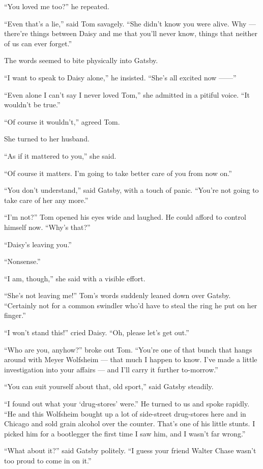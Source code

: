 \documentclass{znotebook}
\begin{document}
``You loved me too?'' he repeated.

``Even that's a lie,'' said Tom savagely. ``She didn't know you were alive. Why — there're things between Daisy and me that you'll never know, things that neither of us can ever forget.''

The words seemed to bite physically into Gatsby.

``I want to speak to Daisy alone,'' he insisted. ``She's all excited now ——''

``Even alone I can't say I never loved Tom,'' she admitted in a pitiful voice. ``It wouldn't be true.''

``Of course it wouldn't,'' agreed Tom.

She turned to her husband.

``As if it mattered to you,'' she said.

``Of course it matters. I'm going to take better care of you from now on.''

``You don't understand,'' said Gatsby, with a touch of panic. ``You're not going to take care of her any more.''

``I'm not?'' Tom opened his eyes wide and laughed. He could afford to control himself now. ``Why's that?''

``Daisy's leaving you.''

``Nonsense.''

``I am, though,'' she said with a visible effort.

``She's not leaving me!'' Tom's words suddenly leaned down over Gatsby. ``Certainly not for a common swindler who'd have to steal the ring he put on her finger.''

``I won't stand this!'' cried Daisy. ``Oh, please let's get out.''

``Who are you, anyhow?'' broke out Tom. ``You're one of that bunch that hangs around with Meyer Wolfsheim — that much I happen to know. I've made a little investigation into your affairs — and I'll carry it further to-morrow.''

``You can suit yourself about that, old sport,'' said Gatsby steadily.

``I found out what your ‘drug-stores' were.'' He turned to us and spoke rapidly. ``He and this Wolfsheim bought up a lot of side-street drug-stores here and in Chicago and sold grain alcohol over the counter. That's one of his little stunts. I picked him for a bootlegger the first time I saw him, and I wasn't far wrong.''

``What about it?'' said Gatsby politely. ``I guess your friend Walter Chase wasn't too proud to come in on it.''
\end{document}
